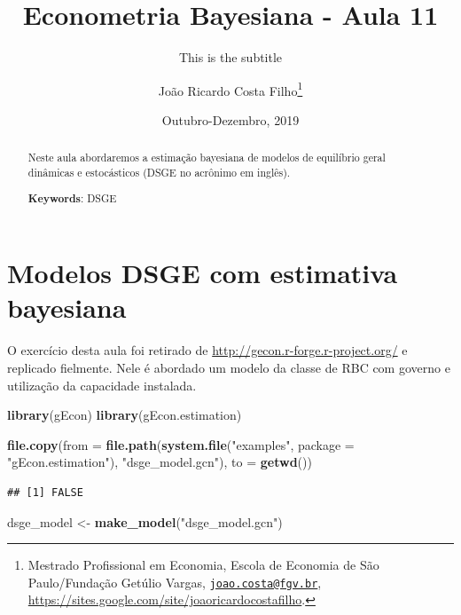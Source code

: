 \documentclass[12pt,a4paper,]{article}
\title{Econometria Bayesiana - Aula 11}
\subtitle{This is the subtitle}
\author{João Ricardo Costa Filho\footnote{Mestrado Profissional em Economia,
  Escola de Economia de São Paulo/Fundação Getúlio Vargas,
  \href{mailto:joao.costa@fgv.br}{\texttt{joao.costa@fgv.br}},
  \url{https://sites.google.com/site/joaoricardocostafilho}.}}
\date{Outubro-Dezembro, 2019}
\newcommand{\0}{\mathbf{0}}
\newenvironment{Shaded}{\begin{snugshade}}{\end{snugshade}}
\newcommand{\DataTypeTok}[1]{\textcolor[rgb]{0.13,0.29,0.53}{#1}}
\newcommand{\KeywordTok}[1]{\textcolor[rgb]{0.13,0.29,0.53}{\textbf{#1}}}
\newcommand{\NormalTok}[1]{#1}
\newcommand{\StringTok}[1]{\textcolor[rgb]{0.31,0.60,0.02}{#1}}
\begin{document}
\maketitle

\begin{abstract}
\doublespacing \noindent Neste aula abordaremos a estimação bayesiana de modelos de equilíbrio
geral dinâmicas e estocásticos (DSGE no acrônimo em inglês).
\vspace{.25cm}

\noindent \textbf{Keywords}: DSGE
\vspace{.25cm}

\end{abstract}


\newpage

\hypertarget{modelos-dsge-com-estimativa-bayesiana}{%
\section{Modelos DSGE com estimativa
bayesiana}\label{modelos-dsge-com-estimativa-bayesiana}}

O exercício desta aula foi retirado de
\url{http://gecon.r-forge.r-project.org/} e replicado fielmente. Nele é
abordado um modelo da classe de RBC com governo e utilização da
capacidade instalada.

\begin{Shaded}
\begin{Highlighting}[]
\KeywordTok{library}\NormalTok{(gEcon)}
\KeywordTok{library}\NormalTok{(gEcon.estimation)}

\KeywordTok{file.copy}\NormalTok{(}\DataTypeTok{from =} \KeywordTok{file.path}\NormalTok{(}\KeywordTok{system.file}\NormalTok{(}\StringTok{"examples"}\NormalTok{, }\DataTypeTok{package =} \StringTok{"gEcon.estimation"}\NormalTok{),}
                           \StringTok{"dsge_model.gcn"}\NormalTok{), }\DataTypeTok{to =} \KeywordTok{getwd}\NormalTok{())}
\end{Highlighting}
\end{Shaded}

\begin{verbatim}
## [1] FALSE
\end{verbatim}

\begin{Shaded}
\begin{Highlighting}[]
\NormalTok{dsge_model <-}\StringTok{ }\KeywordTok{make_model}\NormalTok{(}\StringTok{"dsge_model.gcn"}\NormalTok{)}
\end{Highlighting}
\end{Shaded}
\end{document}
